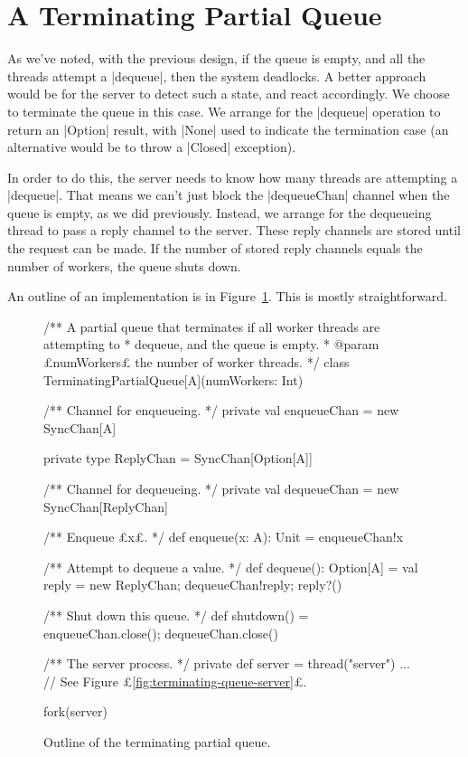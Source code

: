 
\section{A Terminating Partial Queue}

As we've noted, with the previous design, if the queue is empty, and all the
threads attempt a |dequeue|, then the system deadlocks.
%
A better approach would be for the server to detect such a state, and react
accordingly.  We choose to terminate the queue in this case.  We arrange for
the |dequeue| operation to return an |Option| result, with |None| used to
indicate the termination case (an alternative would be to throw a |Closed|
exception).

In order to do this, the server needs to know how many threads are attempting
a |dequeue|.  That means we can't just block the |dequeueChan| channel when
the queue is empty, as we did previously.  Instead, we arrange for the
dequeueing thread to pass a reply channel to the server.  These reply channels
are stored until the request can be made.  If the number of stored reply
channels equals the number of workers, the queue shuts down.

An outline of an implementation is in Figure~\ref{fig:terminating-queue}.
This is mostly straightforward.


\begin{figure}
\begin{scala}
/** A partial queue that terminates if all worker threads are attempting to
  * dequeue, and the queue is empty.
  * @param £numWorkers£ the number of worker threads. */
class TerminatingPartialQueue[A](numWorkers: Int){
  /** Channel for enqueueing. */
  private val enqueueChan = new SyncChan[A]

  private type ReplyChan = SyncChan[Option[A]]

  /** Channel for dequeueing. */
  private val dequeueChan = new SyncChan[ReplyChan]

  /** Enqueue £x£. */
  def enqueue(x: A): Unit = enqueueChan!x

  /** Attempt to dequeue a value. */
  def dequeue(): Option[A] = {
    val reply = new ReplyChan; dequeueChan!reply; reply?()
  }

  /** Shut down this queue. */
  def shutdown() = { enqueueChan.close(); dequeueChan.close() }

  /** The server process. */
  private def server = thread("server"){ ... } // See Figure £\ref{fig:terminating-queue-server}£.

  fork(server)
}
\end{scala}
\caption{Outline of the terminating partial queue.}
\label{fig:terminating-queue}
\end{figure}

